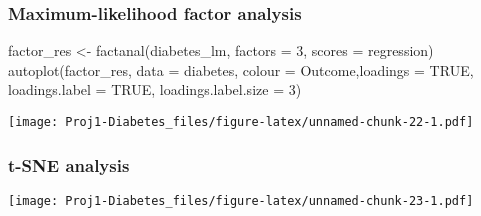 \documentclass[
]{article}
\newenvironment{Shaded}{\begin{snugshade}}{\end{snugshade}}
\newcommand{\AttributeTok}[1]{\textcolor[rgb]{0.77,0.63,0.00}{#1}}
\newcommand{\ConstantTok}[1]{\textcolor[rgb]{0.00,0.00,0.00}{#1}}
\newcommand{\DecValTok}[1]{\textcolor[rgb]{0.00,0.00,0.81}{#1}}
\newcommand{\FloatTok}[1]{\textcolor[rgb]{0.00,0.00,0.81}{#1}}
\newcommand{\FunctionTok}[1]{\textcolor[rgb]{0.00,0.00,0.00}{#1}}
\newcommand{\NormalTok}[1]{#1}
\newcommand{\OtherTok}[1]{\textcolor[rgb]{0.56,0.35,0.01}{#1}}
\newcommand{\SpecialCharTok}[1]{\textcolor[rgb]{0.00,0.00,0.00}{#1}}
\newcommand{\StringTok}[1]{\textcolor[rgb]{0.31,0.60,0.02}{#1}}
\begin{document}
\hypertarget{maximum-likelihood-factor-analysis}{%
\subsubsection{Maximum-likelihood factor
analysis}\label{maximum-likelihood-factor-analysis}}

\begin{Shaded}
\begin{Highlighting}[]
\NormalTok{factor\_res }\OtherTok{\textless{}{-}} \FunctionTok{factanal}\NormalTok{(diabetes\_lm, }\AttributeTok{factors =} \DecValTok{3}\NormalTok{, }\AttributeTok{scores =} \StringTok{\textquotesingle{}regression\textquotesingle{}}\NormalTok{)}
\FunctionTok{autoplot}\NormalTok{(factor\_res, }\AttributeTok{data =}\NormalTok{ diabetes, }\AttributeTok{colour =} \StringTok{\textquotesingle{}Outcome\textquotesingle{}}\NormalTok{,}\AttributeTok{loadings =} \ConstantTok{TRUE}\NormalTok{, }\AttributeTok{loadings.label =} \ConstantTok{TRUE}\NormalTok{, }\AttributeTok{loadings.label.size  =} \DecValTok{3}\NormalTok{)}
\end{Highlighting}
\end{Shaded}

\texttt{[image: Proj1-Diabetes\_files/figure-latex/unnamed-chunk-22-1.pdf]}

\hypertarget{t-sne-analysis}{%
\subsubsection{t-SNE analysis}\label{t-sne-analysis}}

\begin{Shaded}
\end{Shaded}

\texttt{[image: Proj1-Diabetes\_files/figure-latex/unnamed-chunk-23-1.pdf]}
\end{document}
